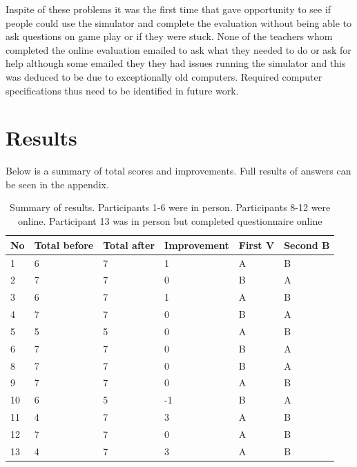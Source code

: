 \documentclass[11pt]{report}
\begin{document}
Inspite of these problems it was the first time that gave opportunity to see if people could use the simulator and complete the evaluation without being able to ask questions on game play or if they were stuck. None of the teachers whom completed the online evaluation emailed to ask what they needed to do or ask for help although some emailed they they had issues running the simulator and this was deduced to be due to exceptionally old computers. Required computer specifications thus need to be identified in future work.  

\section{Results}


Below is a summary of total scores and improvements. Full results of answers can be seen in the appendix. 

\begin{table}[H]
    \begin{tabular}{| p{1cm} | p{2cm} | p{2cm} | p{3cm} | p{3cm} | p{3cm} |}
    \hline
    \textbf{No} & \textbf{Total before} & \textbf{Total after} & \textbf{Improvement} & \textbf{First V} & \textbf{Second B} \\                                                                                                                                                                                    
	\hline
	1 & 6 & 7 & 1 & A & B \\ \hline
	2 & 7 & 7 & 0 & B & A \\ \hline
	3 & 6 & 7 & 1 & A & B \\ \hline
	4 & 7 & 7 & 0 & B & A \\ \hline
	5 & 5 & 5 & 0 & A & B \\ \hline
	6 & 7 & 7 & 0 & B & A \\ \hline
	
	8 & 7 & 7 & 0 & B & A\\ \hline
	9 & 7 & 7 & 0 & A & B \\ \hline
	10 & 6 & 5 & -1 & B & A \\ \hline
	11 & 4 & 7 & 3 & A & B \\ \hline
	12 & 7 & 7 & 0 & A & B \\ \hline
	13 & 4 & 7 & 3 & A & B \\ \hline
    \hline
    \end{tabular}
    \caption{Summary of results. Participants 1-6 were in person. Participants 8-12 were online. Participant 13 was in person but completed questionnaire online}
\end{table}
\end{document}
